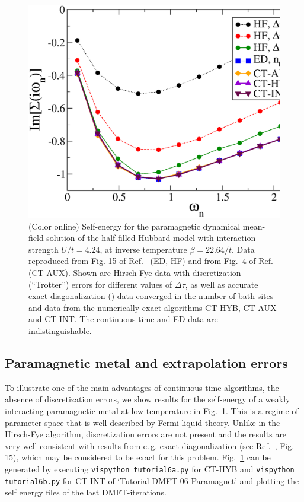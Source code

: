 \documentclass[3p,twocolumn]{elsarticle}
\begin{document}
\begin{figure}
\includegraphics[width=0.9\columnwidth]{se}
\caption{
(Color online) Self-energy for the paramagnetic dynamical mean-field solution of the half-filled Hubbard model with interaction strength $U/t = 4.24$, at inverse temperature $\beta =22.64/t$. Data reproduced from Fig. 15 of Ref.~\cite{Georges96} (ED, HF) and from Fig.~4 of Ref.~\cite{Gull08_ctaux} (CT-AUX). Shown are Hirsch Fye data with discretization (``Trotter'') errors for different values of $\Delta \tau$, as well as accurate exact diagonalization (\cite{Caffarel94}) data converged in the number of bath sites and data from the numerically exact algorithms CT-HYB, CT-AUX and CT-INT. The continuous-time and ED data are indistinguishable.
\label{fig:sigma}
}
\end{figure}
\subsection{Paramagnetic metal and extrapolation errors}
To illustrate one of the main advantages of continuous-time algorithms, the absence of discretization errors, we show results for the self-energy of a weakly interacting paramagnetic metal at low temperature in Fig.~\ref{fig:sigma}.
This is a regime of parameter space that is well described by Fermi liquid theory. Unlike in the Hirsch-Fye algorithm, discretization errors are not present and the results are very well consistent with results from e.\,g. exact diagonalization (see Ref.~\cite{Georges96}, Fig. 15), which may be considered to be exact for this problem.
Fig.~\ref{fig:sigma} can be generated by executing \verb*#vispython tutorial6a.py# for CT-HYB and  \verb*#vispython tutorial6b.py# for CT-INT of `Tutorial DMFT-06 Paramagnet' and plotting the self energy files of the last DMFT-iterations.
\end{document}
